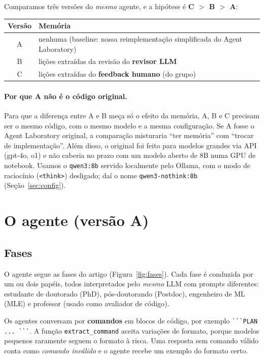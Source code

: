\documentclass[11pt,a4paper]{article}
\begin{document}
Comparamos três versões do \emph{mesmo} agente, e a hipótese é \textbf{C $>$ B $>$ A}:

\begin{center}
\begin{tabular}{cl}
\toprule
Versão & Memória \\
\midrule
A & nenhuma (baseline: nossa reimplementação simplificada do Agent Laboratory) \\
B & lições extraídas da revisão do \textbf{revisor LLM} \\
C & lições extraídas do \textbf{feedback humano} (do grupo) \\
\bottomrule
\end{tabular}
\end{center}

\paragraph{Por que A não é o código original.} Para que a diferença entre A e B meça só o
efeito da memória, A, B e C precisam ser o mesmo código, com o mesmo modelo e a mesma
configuração. Se A fosse o Agent Laboratory original, a comparação misturaria ``ter
memória'' com ``trocar de implementação''. Além disso, o original foi feito para modelos
grandes via API (gpt-4o, o1) e não caberia no prazo com um modelo aberto de 8B numa GPU de
notebook. Usamos o \texttt{qwen3:8b} servido localmente pelo Ollama, com o modo de raciocínio
(\texttt{<think>}) desligado; daí o nome \texttt{qwen3-nothink:8b} (Seção~\ref{sec:config}).

\section{O agente (versão A)}

\subsection{Fases}

O agente segue as fases do artigo (Figura~\ref{fig:fases}). Cada fase é conduzida por um ou
dois papéis, todos interpretados pelo \emph{mesmo} LLM com prompts diferentes: estudante de
doutorado (PhD), pós-doutorando (Postdoc), engenheiro de ML (MLE) e professor (usado como
avaliador de código).

Os agentes conversam por \textbf{comandos} em blocos de código, por exemplo
\verb|```PLAN ... ```|. A função \texttt{extract\_command} aceita variações de formato,
porque modelos pequenos raramente seguem o formato à risca. Uma resposta sem comando válido
conta como \emph{comando inválido} e o agente recebe um exemplo do formato certo.
\end{document}
